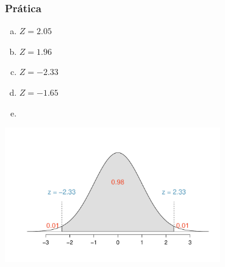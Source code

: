 
\begin{frame}
\frametitle{Prática}
\justifying
{}

\begin{multicols}{2}
\begin{enumerate}[(a)]
\item $Z = 2.05$
\item $Z = 1.96$
\item $Z = -2.33$
\item $Z = -1.65$
\item[]
\end{enumerate}
\end{multicols}


\begin{center}
\includegraphics[width=0.7\textwidth]{4-2_conf_int/middle98.pdf}
\end{center}


\end{frame}


